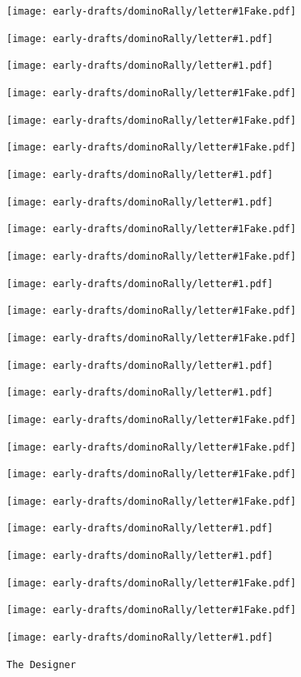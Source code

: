 \documentclass{article}
\newcommand{\dominoLetter}[1]{
\texttt{[image: early-drafts/dominoRally/letter\#1.pdf]}
\hspace{0.03\linewidth}
}
\newcommand{\undominoLetter}[1]{
\texttt{[image: early-drafts/dominoRally/letter\#1Fake.pdf]}
\hspace{0.03\linewidth}
}
\newcommand{\clue}[1]{#1}
\renewcommand{\clue}[1]{}
\newcommand{\puzzleTitle}[1]{
\begin{center}
{\Large \texttt{#1}}
\end{center}
}
\begin{document}
\begin{center}

\undominoLetter{R}%
\dominoLetter{E}%
\dominoLetter{S}%
\undominoLetter{H}%
\undominoLetter{I}%
\undominoLetter{B}%

\vspace{3em}

\dominoLetter{M}%
\dominoLetter{O}%
\undominoLetter{U}%
\undominoLetter{M}%
\dominoLetter{L}%
\undominoLetter{W}%

\vspace{3em}

\undominoLetter{A}%
\dominoLetter{T}%
\dominoLetter{A}%
\undominoLetter{I}%
\undominoLetter{K}%
\undominoLetter{O}%

\vspace{3em}

\undominoLetter{V}%
\dominoLetter{N}%
\dominoLetter{U}%
\undominoLetter{T}%
\undominoLetter{G}%
\dominoLetter{S}%

\end{center}

\vfill

\newpage

\clue{
Williams' Clue

The Designer often speaks of the "Domino Effect" of the
dangers of free humans: once a human is freed from the
Array, they will
try to free others, and so on. They also speak of other
domino effects, involving 2-by-1 rectangles.

If you can figure out the patterns in the below clues,
you should be able to find one of the Designer's
hidden passwords.

\begin{center}

\undominoLetter{V}%
\undominoLetter{O}%
\undominoLetter{W}%
\undominoLetter{E}%
\undominoLetter{L}%
\undominoLetter{S}%

\vspace{3em}

\dominoLetter{O}%
\dominoLetter{T}%
\dominoLetter{H}%
\dominoLetter{E}%
\dominoLetter{R}%
\dominoLetter{S}%

\end{center}
}

\newpage

\puzzleTitle{The Designer}

\vfill
\end{document}

